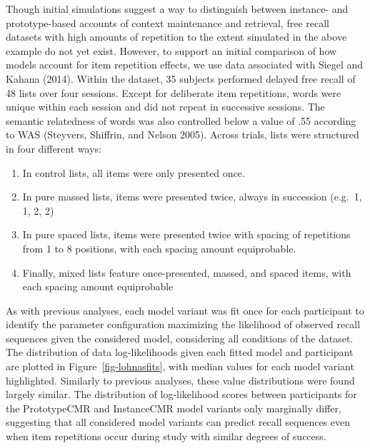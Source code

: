 \documentclass[
  letterpaper,
  DIV=11]{article}
\begin{document}
Though initial simulations suggest a way to distinguish between
instance- and prototype-based accounts of context maintenance and
retrieval, free recall datasets with high amounts of repetition to the
extent simulated in the above example do not yet exist. However, to
support an initial comparison of how models account for item repetition
effects, we use data associated with Siegel and Kahana (2014). Within
the dataset, 35 subjects performed delayed free recall of 48 lists over
four sessions. Except for deliberate item repetitions, words were unique
within each session and did not repeat in successive sessions. The
semantic relatedness of words was also controlled below a value of .55
according to WAS (Steyvers, Shiffrin, and Nelson 2005). Across trials,
lists were structured in four different ways:

\begin{enumerate}
\def\labelenumi{\arabic{enumi}.}
\item
  In control lists, all items were only presented once.
\item
  In pure massed lists, items were presented twice, always in succession
  (e.g.~1, 1, 2, 2)
\item
  In pure spaced lists, items were presented twice with spacing of
  repetitions from 1 to 8 positions, with each spacing amount
  equiprobable.
\item
  Finally, mixed lists feature once-presented, massed, and spaced items,
  with each spacing amount equiprobable
\end{enumerate}

As with previous analyses, each model variant was fit once for each
participant to identify the parameter configuration maximizing the
likelihood of observed recall sequences given the considered model,
considering all conditions of the dataset. The distribution of data
log-likelihoods given each fitted model and participant are plotted in
Figure~\ref{fig-lohnasfits}, with median values for each model variant
highlighted. Similarly to previous analyses, these value distributions
were found largely similar. The distribution of log-likelihood scores
between participants for the PrototypeCMR and InstanceCMR model variants
only marginally differ, suggesting that all considered model variants
can predict recall sequences even when item repetitions occur during
study with similar degrees of success.
\end{document}

